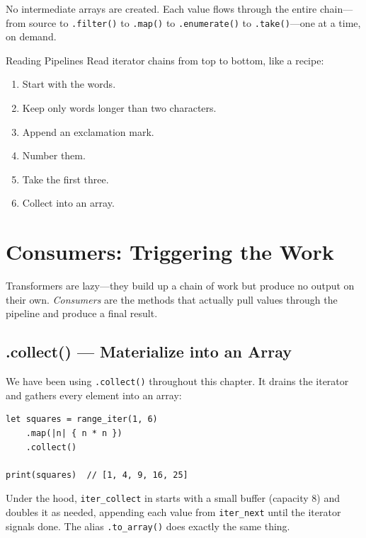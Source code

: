 No intermediate arrays are created.
Each value flows through the entire chain---from source to \lstinline|.filter()| to \lstinline|.map()| to \lstinline|.enumerate()| to \lstinline|.take()|---one at a time, on demand.

\begin{tipbox}{Reading Pipelines}
Read iterator chains from top to bottom, like a recipe:
\begin{enumerate}[nosep]
  \item Start with the words.
  \item Keep only words longer than two characters.
  \item Append an exclamation mark.
  \item Number them.
  \item Take the first three.
  \item Collect into an array.
\end{enumerate}
\end{tipbox}

\section{Consumers: Triggering the Work}\label{sec:iterator-consumers}

Transformers are lazy---they build up a chain of work but produce no output on their own.
\emph{Consumers} are the methods that actually pull values through the pipeline and produce a final result.

\subsection{.collect() --- Materialize into an Array}\label{subsec:iter-collect}

We have been using \lstinline|.collect()| throughout this chapter.
It drains the iterator and gathers every element into an array:

\begin{lstlisting}[language=Lattice, caption={Collecting an iterator}]
let squares = range_iter(1, 6)
    .map(|n| { n * n })
    .collect()

print(squares)  // [1, 4, 9, 16, 25]
\end{lstlisting}

Under the hood, \lstinline|iter_collect| in  starts with a small buffer (capacity 8) and doubles it as needed, appending each value from \lstinline|iter_next| until the iterator signals done.
The alias \lstinline|.to_array()| does exactly the same thing.

